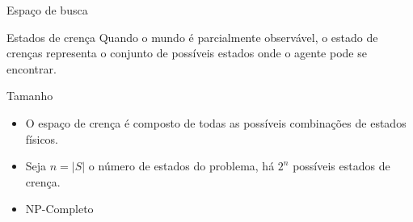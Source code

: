 \begin{frame}{Espaço de busca}
    \begin{block}{Estados de crença}
    { Quando o mundo é parcialmente observável, o estado de crenças 
representa o conjunto de possíveis estados onde o agente pode se encontrar. } \\
    \end{block}
    
    \begin{block}{Tamanho}
        \begin{itemize}
        \item O espaço de crença é composto de todas as possíveis combinações de 
    estados físicos.

        \item Seja $n = |S|$ o número de estados do problema, há $2^{\textit{n}}$ possíveis 
        estados de crença.\\
        
        \item NP-Completo
        \end{itemize}
    \end{block}
   
\end{frame}

